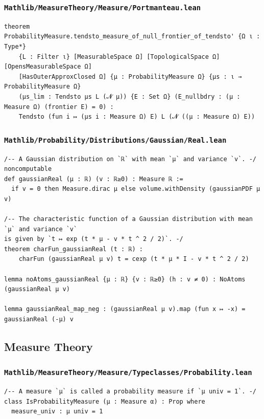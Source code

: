\newpage
\subsubsection{\texttt{Mathlib/MeasureTheory/Measure/Portmanteau.lean}}
\begin{lstlisting}[language=lean]
theorem ProbabilityMeasure.tendsto_measure_of_null_frontier_of_tendsto' {Ω ι : Type*}
    {L : Filter ι} [MeasurableSpace Ω] [TopologicalSpace Ω] [OpensMeasurableSpace Ω]
    [HasOuterApproxClosed Ω] {μ : ProbabilityMeasure Ω} {μs : ι → ProbabilityMeasure Ω}
    (μs_lim : Tendsto μs L (𝓝 μ)) {E : Set Ω} (E_nullbdry : (μ : Measure Ω) (frontier E) = 0) :
    Tendsto (fun i ↦ (μs i : Measure Ω) E) L (𝓝 ((μ : Measure Ω) E))
\end{lstlisting}

\subsubsection{\texttt{Mathlib/Probability/Distributions/Gaussian/Real.lean}}
\begin{lstlisting}[language=lean]
/-- A Gaussian distribution on `ℝ` with mean `μ` and variance `v`. -/
noncomputable
def gaussianReal (μ : ℝ) (v : ℝ≥0) : Measure ℝ :=
  if v = 0 then Measure.dirac μ else volume.withDensity (gaussianPDF μ v)

/-- The characteristic function of a Gaussian distribution with mean `μ` and variance `v`
is given by `t ↦ exp (t * μ - v * t ^ 2 / 2)`. -/
theorem charFun_gaussianReal (t : ℝ) :
    charFun (gaussianReal μ v) t = cexp (t * μ * I - v * t ^ 2 / 2)

lemma noAtoms_gaussianReal {μ : ℝ} {v : ℝ≥0} (h : v ≠ 0) : NoAtoms (gaussianReal μ v)

lemma gaussianReal_map_neg : (gaussianReal μ v).map (fun x ↦ -x) = gaussianReal (-μ) v
\end{lstlisting}

\subsection{Measure Theory}

\subsubsection{\texttt{Mathlib/MeasureTheory/Measure/Typeclasses/Probability.lean}}
\begin{lstlisting}[language=lean]
/-- A measure `μ` is called a probability measure if `μ univ = 1`. -/
class IsProbabilityMeasure (μ : Measure α) : Prop where
  measure_univ : μ univ = 1
\end{lstlisting}

